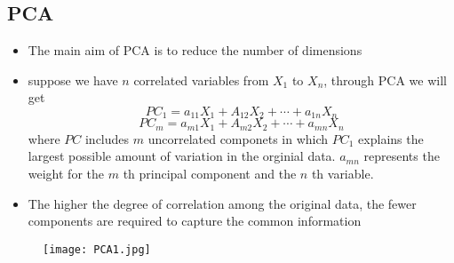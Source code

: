 \documentclass[13pt]{beamer}
\begin{document}
\subsection{PCA}
\begin{frame}
	\begin{itemize}
		\item The main aim of PCA is to reduce the number of dimensions
		\item suppose we have $n$  correlated variables from $ X_1 $ to $ X_n$, through PCA we will get
		\[ PC_1=a_{11}X_1+A_{12}X_2+\cdots+a_{1n}X_n \]
		\[ PC_m=a_{m1}X_1+A_{m2}X_2+\cdots+a_{mn}X_n \]
	where $PC$ includes $m$ uncorrelated componets in which $PC_1$ explains the largest possible amount of variation in the orginial data. $a_{mn}$ represents the weight for the $m$ th principal component and the $n$ th variable. 
		\item The higher the degree of correlation among the original data, the fewer components are required to capture the common information	
	\end{itemize}
\end{frame}
\begin{frame}
	\begin{figure}[!ht]
		\texttt{[image: PCA1.jpg]}
	\end{figure}
\end{frame}
\end{document}
